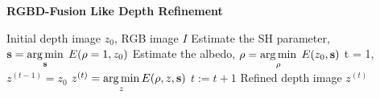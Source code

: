 \begin{algorithm}[!htbp]
    \begin{algorithmic}[1]
          \caption{\textbf{RGBD-Fusion Like Depth Refinement}}
        \label{alg:rgbd_fusion}
         \renewcommand{\algorithmicrequire}{\textbf{Input:}}
         \renewcommand{\algorithmicensure}{\textbf{Output:}}
         \REQUIRE Initial depth image $z_0$, RGB image $I$
         \vspace{1.8mm}
         \STATE Estimate the SH parameter, $\mathbf{s} = \operatorname*{arg\,min} \limits_{\mathbf{s}} \; E(\rho = 1, z_0)$ 
         \STATE Estimate the albedo, $\rho = \operatorname*{arg\,min} \limits_{\rho} \; E(z_0, \mathbf{s})$ 
         \STATE t = 1, $z^{(t-1)} = z_0$
         \vspace{1.8mm}
           \vspace{1.8mm}
              \STATE $z^{(t)} = \operatorname*{arg\,min} \limits_{z} E(\rho, z, \mathbf{s})$ 
                  \STATE $t := t + 1$
         \vspace{1.8mm}
          \ENDWHILE
          \vspace{1.8mm}
          \ENSURE  Refined depth image $z^{(t)}$
    \end{algorithmic}
\end{algorithm}

